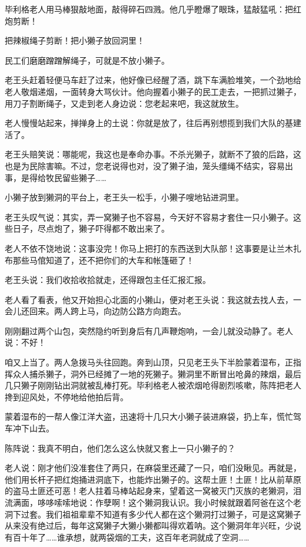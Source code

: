 \par 毕利格老人用马棒狠敲地面，敲得碎石四溅。他几乎瞪爆了眼珠，猛敲猛吼：把红炮剪断！
\par 把辣椒绳子剪断！把小獭子放回洞里！
\par 民工们磨磨蹭蹭解绳子，可就是不放小獭子。
\par 老王头赶着轻便马车赶了过来，他好像已经醒了酒，跳下车满脸堆笑，一个劲地给老人敬烟递烟，一面转身大骂伙计。他向握着小獭子的民工走去，一把抓过獭子，用刀子割断绳子，又走到老人身边说：您老起来吧，我这就放生。
\par 老人慢慢站起来，掸掸身上的土说：你就是放了，往后再别想揽到我们大队的基建活了。
\par 老王头赔笑说：哪能呢，我这也是奉命办事。不杀光獭子，就断不了狼的后路，这也是为民除害嘛。不过，您老说得也对，没了獭子油，笼头缰绳不结实，容易出事，是得给牧民留些獭子……
\par 小獭子放到獭洞的平台上，老王头一松手，小獭子嗖地钻进洞里。
\par 老王头叹气说：其实，弄一窝獭子也不容易，今天好不容易才套住一只小獭子。这些日子，尽点炮了，獭子吓得都不敢出来了。
\par 老人不依不饶地说：这事没完！你马上把打的东西送到大队部！这事要是让兰木扎布那些马倌知道了，还不把你们的大车和帐篷砸了！
\par 老王头说：我们收拾收拾就走，还得跟包主任汇报汇报。
\par 老人看了看表，他又开始担心北面的小獭山，便对老王头说：我这就去找人去，一会儿还回来。两人跨上马，向边防公路方向跑去。
\par 刚刚翻过两个山包，突然隐约听到身后有几声鞭炮响，一会儿就没动静了。老人说：不好！
\par 咱又上当了。两人急拨马头往回跑。奔到山顶，只见老王头下半脸蒙着湿布，正指挥众人捕杀獭子，洞外已经摊了一地的死獭子。獭洞里不断冒出呛鼻的辣烟，最后几只獭子刚刚钻出洞就被乱棒打死。毕利格老人被浓烟呛得剧烈咳嗽，陈阵把老人搀到迎风处，不停地给他拍后背。
\par 蒙着湿布的一帮人像江洋大盗，迅速将十几只大小獭子装进麻袋，扔上车，慌忙驾车冲下山去。
\par 陈阵说：我真不明白，他们怎么这么快就又套上一只小獭子的？
\par 老人说：刚才他们没准套住了两只，在麻袋里还藏了一只，咱们没瞅见。再就是，他们用长杆子把红炮捅进洞底下，也能炸出獭子的。这帮土匪！土匪！比从前草原的盗马土匪还可恶！老人拄着马棒站起身来，望着这一窝被灭门灭族的老獭洞，泪流满面，哆哆嗦嗦地说：作孽啊！这个獭洞我认识。我小时候就跟着阿爸在这个老洞下过套。我们祖祖辈辈不知道有多少代人都在这个獭洞打过獭子，可是这窝獭子从来没有绝过后，每年这窝獭子大獭小獭都叫得欢着呐。这个獭洞年年兴旺，少说有百十年了……谁承想，就两袋烟的工夫，这百年老洞就成了空洞……
